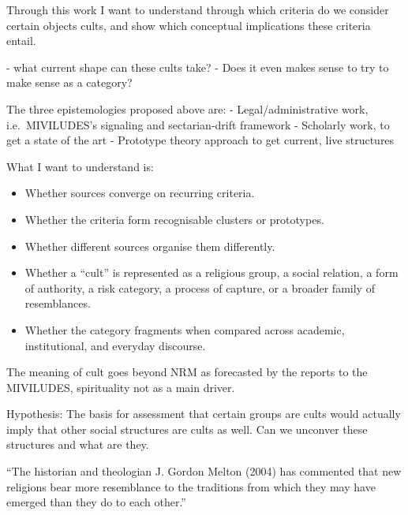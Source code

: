 Through this work I want to understand through which criteria do we consider certain objects cults, and show which conceptual implications these criteria entail.

- what current shape can these cults take?
- Does it even makes sense to try to make sense as a category?

The three epistemologies proposed above are:
- Legal/administrative work, i.e.\ MIVILUDES's signaling and sectarian-drift framework
- Scholarly work, to get a state of the art
- Prototype theory approach to get current, live structures


What I want to understand is:
\begin{itemize}
	\item Whether sources converge on recurring criteria.
	\item Whether the criteria form recognisable clusters or prototypes.
	\item Whether different sources organise them differently.
	\item Whether a “cult” is represented as a religious group, a social relation, a form of authority, a risk category, a process of capture, or a broader family of resemblances.
	\item  Whether the category fragments when compared across academic, institutional, and everyday discourse.
\end{itemize}

The meaning of cult goes beyond NRM as forecasted by the reports to the MIVILUDES, spirituality not as a main driver. 

Hypothesis: The basis for assessment that certain groups are cults would actually imply that other social structures are cults as well. Can we unconver these structures and what are they.

\enquote{The historian and theologian J. Gordon Melton (2004) has commented that new religions bear more resemblance to the traditions from which they may have emerged than they do to each other.}\autocite[pp.239]{barkerNotsonewReligiousMovements2014}

